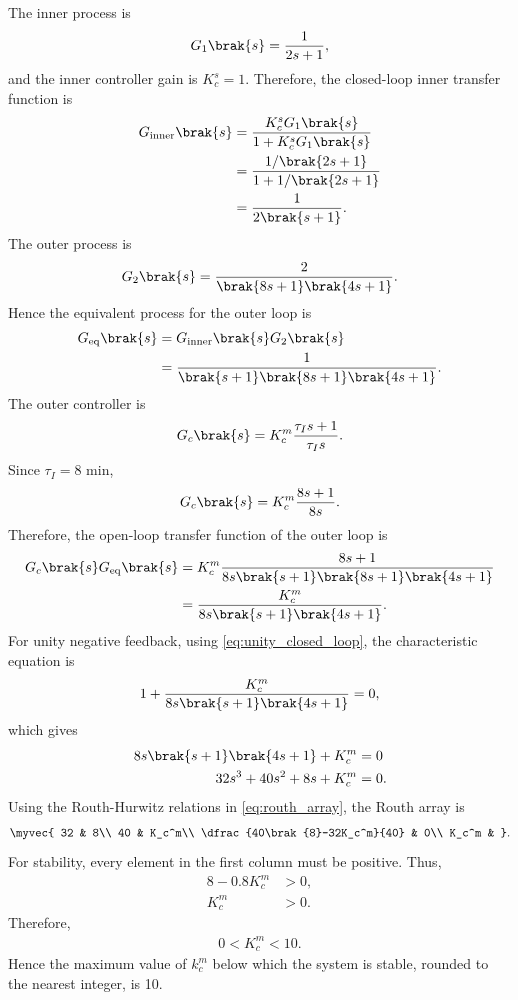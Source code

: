 \begin{enumerate}[label=\thesubsection.\arabic*, ref=\thesubsection.\theenumi,itemsep=0pt]
\solution The inner process is
\begin{align}
G_1\brak{s}=\frac{1}{2s+1},
\end{align}
and the inner controller gain is $K_c^s=1$. Therefore, the closed-loop inner transfer function is
\begin{align}
G_{\mathrm{inner}}\brak{s}
&=\frac{K_c^sG_1\brak{s}}{1+K_c^sG_1\brak{s}}\\
&=\frac{1/\brak{2s+1}}{1+1/\brak{2s+1}}\\
&=\frac{1}{2\brak{s+1}}.
\end{align}
The outer process is
\begin{align}
G_2\brak{s}=\frac{2}{\brak{8s+1}\brak{4s+1}}.
\end{align}
Hence the equivalent process for the outer loop is
\begin{align}
G_{\mathrm{eq}}\brak{s}
&=G_{\mathrm{inner}}\brak{s}G_2\brak{s}\\
&=\frac{1}{\brak{s+1}\brak{8s+1}\brak{4s+1}}.
\end{align}
The outer controller is
\begin{align}
G_c\brak{s}=K_c^m\frac{\tau_Is+1}{\tau_Is}.
\end{align}
Since $\tau_I=8$ min,
\begin{align}
G_c\brak{s}=K_c^m\frac{8s+1}{8s}.
\end{align}
Therefore, the open-loop transfer function of the outer loop is
\begin{align}
G_c\brak{s}G_{\mathrm{eq}}\brak{s}
&=K_c^m\frac{8s+1}{8s\brak{s+1}\brak{8s+1}\brak{4s+1}}\\
&=\frac{K_c^m}{8s\brak{s+1}\brak{4s+1}}.
\end{align}
For unity negative feedback, using \eqref{eq:unity_closed_loop}, the characteristic equation is
\begin{align}
1+\frac{K_c^m}{8s\brak{s+1}\brak{4s+1}}=0,
\end{align}
which gives
\begin{align}
8s\brak{s+1}\brak{4s+1}+K_c^m&=0\\
32s^3+40s^2+8s+K_c^m&=0.
\end{align}
Using the Routh-Hurwitz relations in \eqref{eq:routh_array}, the Routh array is
\begin{align}
\myvec{
32 & 8\\
40 & K_c^m\\
\dfrac{40\brak{8}-32K_c^m}{40} & 0\\
K_c^m &
}.
\end{align}
For stability, every element in the first column must be positive. Thus,
\begin{align}
8-0.8K_c^m&>0,\\
K_c^m&>0.
\end{align}
Therefore,
\begin{align}
0<K_c^m<10.
\end{align}
Hence the maximum value of $k_c^m$ below which the system is stable, rounded to the nearest integer, is 10.


\end{enumerate}
